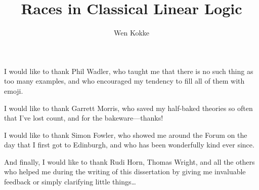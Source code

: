 \documentclass[12pt,a4paper,UKenglish,mscres,logo,twoside,notimes,parskip,lfcs]{infthesis}
\title{Races in Classical Linear Logic}
\author{Wen Kokke}
\begin{document}
\begin{preliminary}
  \maketitle
  \begin{acknowledgements}
    I would like to thank Phil Wadler, who taught me that there is no such thing
    as too many examples, and who encouraged my tendency to fill all of them
    with emoji.
    
    I would like to thank Garrett Morris, who saved my half-baked theories so
    often that I've lost count, and for the bakeware---thanks!

    I would like to thank Simon Fowler, who showed me around the Forum on the
    day that I first got to Edinburgh, and who has been wonderfully kind ever
    since.

    And finally, I would like to thank Rudi Horn, Thomas Wright, and all the
    others who helped me during the writing of this dissertation by giving me
    invaluable feedback or simply clarifying little things\ldots
  \end{acknowledgements}
  \standarddeclaration
  \tableofcontents
\end{preliminary}







\printbibliography
\end{document}
